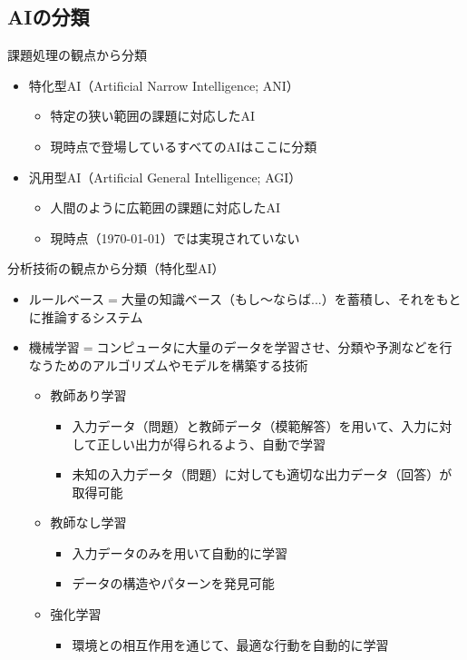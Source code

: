 \documentclass[dvipdfmx,aspectratio=169]{beamer}
\begin{document}
	\subsection{AIの分類}
	\begin{frame}{課題処理の観点から分類}
		\begin{itemize}
			\item \alert{特化型AI}（Artificial Narrow Intelligence; ANI）
			\begin{itemize}
				\item 特定の狭い範囲の課題に対応したAI
				\item 現時点で登場しているすべてのAIはここに分類
			\end{itemize}
			\item \alert{汎用型AI}（Artificial General Intelligence; AGI）
			\begin{itemize}
				\item 人間のように広範囲の課題に対応したAI
				\item 現時点（\today）では実現されていない
			\end{itemize}
		\end{itemize}		
	\end{frame}
	\begin{frame}{分析技術の観点から分類（特化型AI）}
		\begin{itemize}
			\item \alert{ルールベース}$ = $大量の知識ベース（もし～ならば...）を蓄積し、それをもとに推論するシステム
			\item \alert{機械学習}$ = $コンピュータに大量のデータを学習させ、分類や予測などを行なうためのアルゴリズムやモデルを構築する技術
			\begin{itemize}
				\item \alert{教師あり学習}
				\begin{itemize}
					\item 入力データ（問題）と教師データ（模範解答）を用いて、入力に対して正しい出力が得られるよう、自動で学習
					\item 未知の入力データ（問題）に対しても適切な出力データ（回答）が取得可能
				\end{itemize}
				\item \alert{教師なし学習}
				\begin{itemize}
					\item 入力データのみを用いて自動的に学習
					\item データの構造やパターンを発見可能
				\end{itemize}
				\item \alert{強化学習}
				\begin{itemize}
					\item 環境との相互作用を通じて、最適な行動を自動的に学習
				\end{itemize}
			\end{itemize}
		\end{itemize}
	\end{frame}
	
\end{document}
